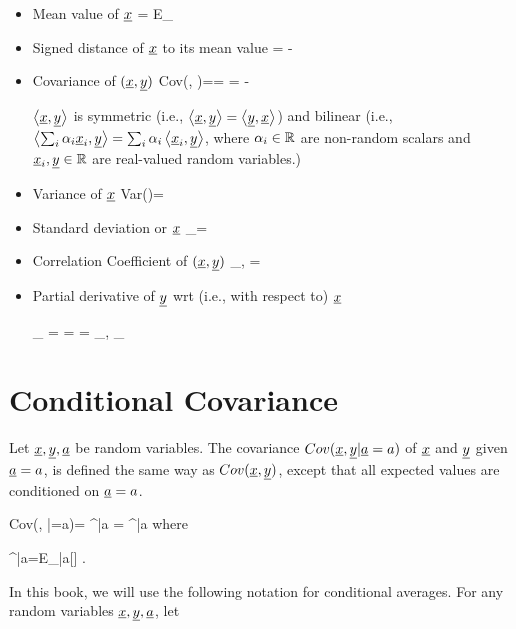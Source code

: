 \begin{itemize}
\item
Mean value of ${\underline{x}}$
\beq
\av{\rvx}=
E_\rvx[\rvx]
\eeq

\item
Signed distance of ${\underline{x}}$ to its mean value
\beq
\Delta \rvx = \rvx - \av{\rvx}
\eeq

\item
Covariance of $({\underline{x}}, {\underline{y}})$
\beq
Cov(\rvx, \rvy)=\av{\rvx, \rvy}=
\av{\Delta \rvx \Delta \rvy}
=
\av{\rvx\rvy}-\av{\rvx}\av{\rvy}
\eeq

$\left\langle{\underline{x}}, {\underline{y}}\right\rangle$ is symmetric
(i.e., $\left\langle{\underline{x}}, {\underline{y}}\right\rangle=\left\langle{\underline{y}}, {\underline{x}}\right\rangle$)
and bilinear (i.e.,
$\left\langle\sum_i \alpha_i{\underline{x}}_i, {\underline{y}}\right\rangle
=
\sum_i\alpha_i\left\langle{\underline{x}}_i, {\underline{y}}\right\rangle$, where
$\alpha_i\in { \mathbb{R}}$
are non-random scalars
and ${\underline{x}}_i, {\underline{y}}\in{ \mathbb{R}}$ are
real-valued random
variables.)

\item
Variance of ${\underline{x}}$
\beq
Var(\rvx)=\av{\rvx, \rvx}
\eeq

\item
Standard deviation or ${\underline{x}}$
\beq
\sigma_\rvx=\sqrt{\av{\rvx, \rvx}}
\eeq

\item
Correlation Coefficient of $({\underline{x}}, {\underline{y}})$
\beq
\rho_{\rvx, \rvy}=
\frac{\av{\rvx, \rvy}}
{\sqrt{\av{\rvx, \rvx}\av{\rvy, \rvy}}}
\eeq

\item Partial derivative of ${\underline{y}}$
wrt (i.e., with respect to) ${\underline{x}}$

\beq
\partial_\rvx\rvy
=
\pder{\rvy}{\rvx}
=
\frac{\av{\rvx,\rvy}}
{\av{\rvx, \rvx}}
=
\rho_{\rvx, \rvy}\frac{
\s_\rvy}
{\s_\rvx}
\eeq
\end{itemize}


\section{Conditional Covariance}
Let ${\underline{x}}, {\underline{y}}, {\underline{a}}$
be random variables.
The covariance $Cov({\underline{x}}, {\underline{y}}|{\underline{a}}=a)$
of ${\underline{x}}$ and ${\underline{y}}$
given ${\underline{a}}=a$, is defined
the same
way as $Cov({\underline{x}}, {\underline{y}})$,
except that all
expected values are
conditioned on ${\underline{a}}=a$.



\beq
Cov(\rvx, \rvy|\rva=a)=
\av{\rvx, \rvy}^{|a}
=
^{|a}
\eeq
where

\beq
\av{\rvx}^{|a}=E_{\rvx|a}[\rvx]
\;.
\eeq

In this book, we will use the following notation
for conditional averages.
For any random
variables ${\underline{x}}, {\underline{y}}, {\underline{a}}$, let

